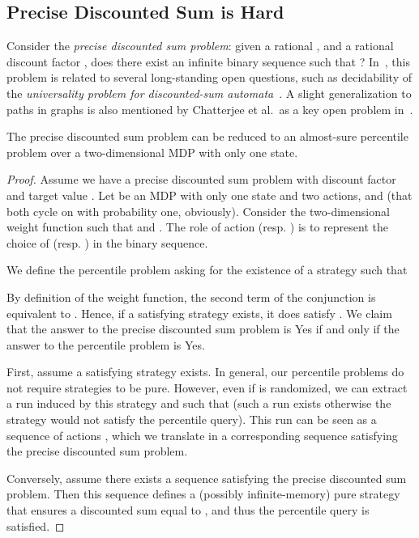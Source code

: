 \documentclass{llncs}
\begin{document}
\subsection{Precise Discounted Sum is Hard}
\label{subsec:precise}

Consider the \textit{precise discounted sum problem}: given a rational , and a rational discount factor , does there exist an infinite binary sequence  such that ? In~\cite{bokerTDS}, this problem is related to several long-standing open questions, such as decidability of the \textit{universality problem for discounted-sum automata}~\cite{DBLP:journals/corr/BokerH14}. A slight generalization to paths in graphs is also mentioned by Chatterjee et al.~as a key open problem in~\cite{DBLP:conf/lpar/ChatterjeeFW13}.

\begin{lemma}
\label{lem:ds_precise}
The precise discounted sum problem can be reduced to an almost-sure percentile problem over a two-dimensional MDP with only one state.
\end{lemma}

\begin{proof}
Assume we have a precise discounted sum problem with discount factor  and target value . Let  be an MDP with only one state  and two actions,  and  (that both cycle on  with probability one, obviously). Consider the two-dimensional weight function  such that  and . The role of action  (resp. ) is to represent the choice of  (resp. ) in the binary sequence.

We define the percentile problem asking for the existence of a strategy  such that

By definition of the weight function, the second term of the conjunction is equivalent to . Hence, if a satisfying strategy  exists, it does satisfy . We claim that the answer to the precise discounted sum problem is \textsf{Yes} if and only if the answer to the percentile problem is \textsf{Yes}.

First, assume a satisfying strategy  exists. In general, our percentile problems do not require strategies to be pure. However, even if  is randomized, we can extract a run  induced by this strategy and such that  (such a run exists otherwise the strategy would not satisfy the percentile query). This run can be seen as a sequence of actions , which we translate in a corresponding sequence  satisfying the precise discounted sum problem.

Conversely, assume there exists a sequence  satisfying the precise discounted sum problem. Then this sequence defines a (possibly infinite-memory) pure strategy  that ensures a discounted sum equal to , and thus the percentile query is satisfied.
\end{proof}
\end{document}
